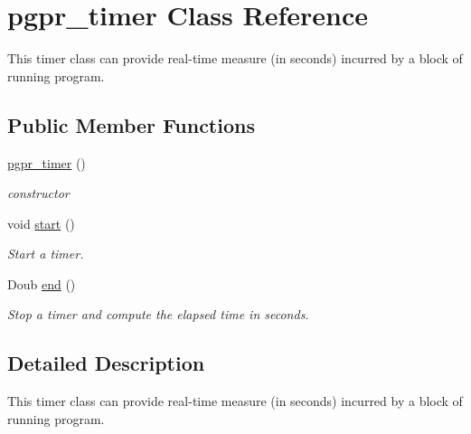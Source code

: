 \hypertarget{classpgpr__timer}{\section{pgpr\+\_\+timer Class Reference}
\label{classpgpr__timer}
}


This timer class can provide real-\/time measure (in seconds) incurred by a block of running program.  


\subsection*{Public Member Functions}
\begin{DoxyCompactItemize}
\item 
\hypertarget{classpgpr__timer_a71561182800d5c213e9c5003c9b2e893}{\hyperlink{classpgpr__timer_a71561182800d5c213e9c5003c9b2e893}{pgpr\+\_\+timer} ()}\label{classpgpr__timer_a71561182800d5c213e9c5003c9b2e893}

\begin{DoxyCompactList}\small\item\em constructor \end{DoxyCompactList}\item 
\hypertarget{classpgpr__timer_ae30d8bfbf046764791f934d198f122b3}{void \hyperlink{classpgpr__timer_ae30d8bfbf046764791f934d198f122b3}{start} ()}\label{classpgpr__timer_ae30d8bfbf046764791f934d198f122b3}

\begin{DoxyCompactList}\small\item\em Start a timer. \end{DoxyCompactList}\item 
Doub \hyperlink{classpgpr__timer_ac81e09244717a72ce57242e86aa6c200}{end} ()
\begin{DoxyCompactList}\small\item\em Stop a timer and compute the elapsed time in seconds. \end{DoxyCompactList}\end{DoxyCompactItemize}


\subsection{Detailed Description}
This timer class can provide real-\/time measure (in seconds) incurred by a block of running program. 

